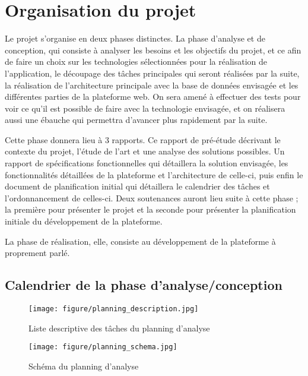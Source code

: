 \section{Organisation du projet}
\label{sec:organisation}
    Le projet s’organise en deux phases distinctes. La phase d’analyse et de conception, qui consiste
    à analyser les besoins et les objectifs du projet, et ce afin de faire un choix sur les technologies
    sélectionnées pour la réalisation de l’application, le découpage des tâches principales qui seront
    réalisées par la suite, la réalisation de l’architecture principale avec la base de données envisagée
    et les différentes parties de la plateforme web. On sera amené à effectuer des tests pour voir ce qu’il
    est possible de faire avec la technologie envisagée, et on réalisera aussi une ébauche qui permettra
    d’avancer plus rapidement par la suite.

    Cette phase donnera lieu à 3 rapports. Ce rapport de pré-étude décrivant le contexte du projet,
    l’étude de l’art et une analyse des solutions possibles. Un rapport de spécifications fonctionnelles
    qui détaillera la solution envisagée, les fonctionnalités détaillées de la plateforme et l’architecture
    de celle-ci, puis enfin le document de planification initial qui détaillera le calendrier des tâches et
    l’ordonnancement de celles-ci. Deux soutenances auront lieu suite à cette phase ; la première pour présenter
    le projet et la seconde pour présenter la planification initiale du développement de la plateforme.

    La phase de réalisation, elle, consiste au développement de la plateforme à proprement parlé.

    \subsection{Calendrier de la phase d’analyse/conception}
    \label{subsec:calendrier}

    \begin{figure}[ht!]
        \centering
        \texttt{[image: figure/planning\_description.jpg]}
        \caption{Liste descriptive des tâches du planning d'analyse}
        \label{fig:gallica}
    \end{figure}

    \begin{figure}[ht!]
        \centering
        \texttt{[image: figure/planning\_schema.jpg]}
        \caption{Schéma du planning d'analyse}
        \label{fig:gallica}
    \end{figure}
